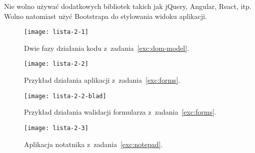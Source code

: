 \documentclass[12pt]{article}
\begin{document}
\begin{enumerate}
            Nie wolno używać dodatkowych bibliotek takich jak jQuery, Angular, React, itp. Wolno natomiast użyć Bootstrapa do stylowania widoku aplikacji.

            \begin{figure}[p]
                \centering
                \texttt{[image: lista-2-1]}
                \caption{Dwie fazy działania kodu z~zadania~\ref{exc:dom-model}.}
                \label{fig:dom-model}
            \end{figure}

            \begin{figure}[p]
                \centering
                \texttt{[image: lista-2-2]}
                \caption{Przykład działania aplikacji z~zadania~\ref{exc:forms}.}
                \label{fig:forms}
            \end{figure}

            \begin{figure}[p]
                \centering
                \texttt{[image: lista-2-2-blad]}
                \caption{Przykład działania walidacji formularza z~zadania~\ref{exc:forms}.}
                \label{fig:forms-error}
            \end{figure}

            \begin{figure}[p]
                \centering
                \texttt{[image: lista-2-3]}
                \caption{Aplikacja notatnika z~zadania~\ref{exc:notepad}.}
                \label{fig:notepad}
            \end{figure}

    \end{enumerate}
\end{document}

